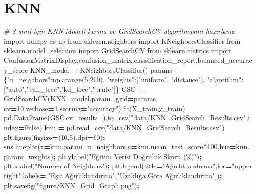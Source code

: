 \documentclass[12pt,twoside]{deuthesis}
\newenvironment{Shaded}{\begin{snugshade}}{\end{snugshade}}
\newcommand{\CommentTok}[1]{\textcolor[rgb]{0.56,0.35,0.01}{\textit{#1}}}
\newcommand{\DecValTok}[1]{\textcolor[rgb]{0.00,0.00,0.81}{#1}}
\newcommand{\ImportTok}[1]{#1}
\newcommand{\NormalTok}[1]{#1}
\newcommand{\OperatorTok}[1]{\textcolor[rgb]{0.81,0.36,0.00}{\textbf{#1}}}
\newcommand{\StringTok}[1]{\textcolor[rgb]{0.31,0.60,0.02}{#1}}
\newcommand{\VariableTok}[1]{\textcolor[rgb]{0.00,0.00,0.00}{#1}}
\begin{document}
\hypertarget{knn-1}{%
\section{KNN}\label{knn-1}}
\begin{Shaded}
\begin{Highlighting}[]
\CommentTok{\# 3 sınıf için KNN Modeli kurma ve GridSearchCV algoritmasını hazırlama}
\ImportTok{import}\NormalTok{ numpy }\ImportTok{as}\NormalTok{ np}
\ImportTok{from}\NormalTok{ sklearn.neighbors }\ImportTok{import}\NormalTok{ KNeighborsClassifier}
\ImportTok{from}\NormalTok{ sklearn.model\_selection }\ImportTok{import}\NormalTok{ GridSearchCV}
\ImportTok{from}\NormalTok{ sklearn.metrics }\ImportTok{import}\NormalTok{ ConfusionMatrixDisplay,confusion\_matrix,classification\_report,balanced\_accuracy\_score}
\NormalTok{KNN\_model }\OperatorTok{=}\NormalTok{ KNeighborsClassifier()}
\NormalTok{params }\OperatorTok{=}\NormalTok{ \{}\StringTok{"n\_neighbors"}\NormalTok{:np.arange(}\DecValTok{5}\NormalTok{,}\DecValTok{200}\NormalTok{),}
          \StringTok{"weights"}\NormalTok{:[}\StringTok{"uniform"}\NormalTok{, }\StringTok{"distance"}\NormalTok{],}
          \StringTok{"algorithm"}\NormalTok{:[}\StringTok{"auto"}\NormalTok{,}\StringTok{"ball\_tree"}\NormalTok{,}\StringTok{"kd\_tree"}\NormalTok{,}\StringTok{"brute"}\NormalTok{]\}}
\NormalTok{GSC }\OperatorTok{=}\NormalTok{ GridSearchCV(KNN\_model,param\_grid}\OperatorTok{=}\NormalTok{params,}
\NormalTok{                   cv}\OperatorTok{=}\DecValTok{10}\NormalTok{,verbose}\OperatorTok{=}\DecValTok{1}\NormalTok{,scoring}\OperatorTok{=}\StringTok{"accuracy"}\NormalTok{).fit(X\_train,y\_train)}
\NormalTok{pd.DataFrame(GSC.cv\_results\_).to\_csv(}\StringTok{"data/KNN\_GridSearch\_Results.csv"}\NormalTok{,index}\OperatorTok{=}\VariableTok{False}\NormalTok{)}
\NormalTok{knn }\OperatorTok{=}\NormalTok{ pd.read\_csv(}\StringTok{"data/KNN\_GridSearch\_Results.csv"}\NormalTok{)}
\NormalTok{plt.figure(figsize}\OperatorTok{=}\NormalTok{(}\DecValTok{10}\NormalTok{,}\DecValTok{5}\NormalTok{),dpi}\OperatorTok{=}\DecValTok{60}\NormalTok{)}\OperatorTok{;}
\NormalTok{sns.lineplot(x}\OperatorTok{=}\NormalTok{knn.param\_n\_neighbors,y}\OperatorTok{=}\NormalTok{knn.mean\_test\_score}\OperatorTok{*}\DecValTok{100}\NormalTok{,hue}\OperatorTok{=}\NormalTok{knn.param\_weights)}\OperatorTok{;}
\NormalTok{plt.ylabel(}\StringTok{"Eğitim Verisi Doğruluk Skoru (\%)"}\NormalTok{)}\OperatorTok{;}
\NormalTok{plt.xlabel(}\StringTok{"Number of Neighbors"}\NormalTok{)}\OperatorTok{;}
\NormalTok{plt.legend(title}\OperatorTok{=}\StringTok{"Ağırlıklandırma"}\NormalTok{,loc}\OperatorTok{=}\StringTok{"upper right"}\NormalTok{,labels}\OperatorTok{=}\NormalTok{[}\StringTok{"Eşit Ağırlıklandırma"}\NormalTok{,}\StringTok{"Uzaklığa Göre Ağırlıklandırma"}\NormalTok{])}\OperatorTok{;}
\NormalTok{plt.savefig(}\StringTok{"figure/KNN\_Grid\_Graph.png"}\NormalTok{)}\OperatorTok{;}
\end{Highlighting}
\end{Shaded}
\end{document}
